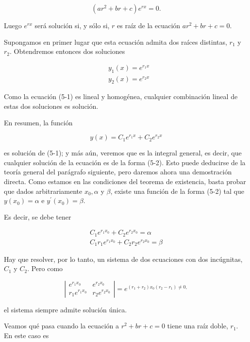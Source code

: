 \documentclass[10pt]{article}
\theoremstyle{plain}
\theoremstyle{definition}
\theoremstyle{remark}
\begin{document}
$$
\left(a r^{2}+b r+c\right) e^{r x}=0 .
$$

Luego $e^{r x}$ será solución si, y sólo si, $r$ es raíz de la ecuación $a r^{2}+b r+c=0$.

Supongamos en primer lugar que esta ecuación admita dos raíces distintas, $r_{1}$ y $r_{2}$. Obtendremos entonces dos soluciones

$$
\begin{aligned}
& y_{1}(x)=e^{r_{1} x} \\
& y_{2}(x)=e^{r_{2} x}
\end{aligned}
$$

Como la ecuación (5-1) es lineal y homogénea, cualquier combinación lineal de estas dos soluciones es solución.

En resumen, la función


\begin{equation*}
y(x)=C_{1} e^{r_{1} x}+C_{2} e^{r_{2} x} \tag{$5\cdot2$}
\end{equation*}


es solución de (5-1); y más aún, veremos que es la integral general, es decir, que cualquier solución de la ecuación es de la forma (5-2). Esto puede deducirse de la teoría general del parágrafo siguiente, pero daremos ahora una demostración directa. Como estamos en las condiciones del teorema de existencia, basta probar que dados arbitrariamente $x_{0}, \alpha$ y $\beta$, existe una función de la forma (5-2) tal que $y\left(x_{0}\right)=\alpha$ e $y^{\prime}\left(x_{0}\right)=\beta$.

Es decir, se debe tener

$$
\begin{gathered}
C_{1} e^{r_{1} x_{0}}+C_{2} e^{r_{2} x_{0}}=\alpha \\
C_{1} r_{1} e^{r_{1} x_{0}}+C_{2} r_{2} e^{r_{2} x_{0}}=\beta
\end{gathered}
$$

Hay que resolver, por lo tanto, un sistema de dos ecuaciones con dos incúgnitas, $C_{1}$ y $C_{2}$. Pero como

$$
\left|\begin{array}{ll}
e^{r_{1} x_{0}} & e^{r_{2} x_{0}} \\
r_{1} e^{r_{1} x_{0}} & r_{2} e^{r_{2} x_{0}}
\end{array}\right|=e^{\left(r_{1}+r_{2}\right) x_{0}\left(r_{2}-r_{1}\right) \neq 0,}
$$

el sistema siempre admite solución única.


Veamos qué pasa cuando la ecuación a $r^{2}+b r+c=0$ tiene una raíz doble, $r_{1}$. En este caso es
\end{document}

